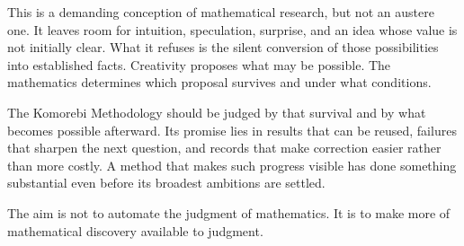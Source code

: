 This is a demanding conception of mathematical research, but not an austere one. It leaves room for intuition, speculation, surprise, and an idea whose value is not initially clear. What it refuses is the silent conversion of those possibilities into established facts. Creativity proposes what may be possible. The mathematics determines which proposal survives and under what conditions.

The Komorebi Methodology should be judged by that survival and by what becomes possible afterward. Its promise lies in results that can be reused, failures that sharpen the next question, and records that make correction easier rather than more costly. A method that makes such progress visible has done something substantial even before its broadest ambitions are settled.

The aim is not to automate the judgment of mathematics. It is to make more of mathematical discovery available to judgment.
